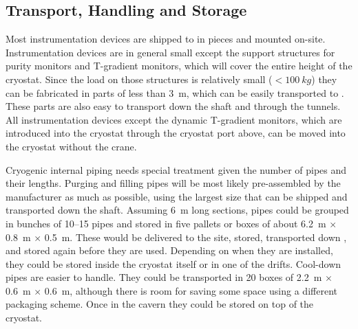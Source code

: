 \subsection{Transport, Handling and Storage}
\label{sec:fdgen-slow-cryo-install-transport}

Most instrumentation devices are shipped to \surf in pieces and mounted on-site. 
Instrumentation devices are in general small except the support structures for purity monitors and T-gradient monitors,
which will cover the entire height of the cryostat. Since the load on those structures is relatively small
 (\(<\SI{100}{kg}\)) they can be fabricated in parts of less than \SI{3}{m},
which can be easily transported to \surf. These parts are also easy to transport down the shaft and through the tunnels.
All instrumentation devices except the dynamic T-gradient monitors, which are introduced into the cryostat through the cryostat port above, 
can be
moved into the cryostat without the crane.

Cryogenic internal piping needs special treatment given the number of pipes and their lengths.
Purging and filling pipes will be most likely pre-assembled by the manufacturer as much as possible, using the largest  
size that can be shipped and transported down the shaft. Assuming \SI{6}{m} long sections,
pipes could be grouped in bunches of \numrange{10}{15} pipes and stored in five pallets or boxes of about \SI{6.2}{m} $\times$ \SI{0.8}{m} $\times$ \SI{0.5}{m}. 
These would be delivered to the site, stored, transported down
, and stored again before they are used.
Depending on when they are installed, they could be stored inside the cryostat itself or in one of the drifts. 
Cool-down pipes are easier to handle. They could be transported in \num{20} boxes of \SI{2.2}{m} $\times$ \SI{0.6}{m} $\times$ \SI{0.6}{m}, although
there is room for saving some space using a different packaging scheme. 
Once in the cavern they could be stored on top of the cryostat.





